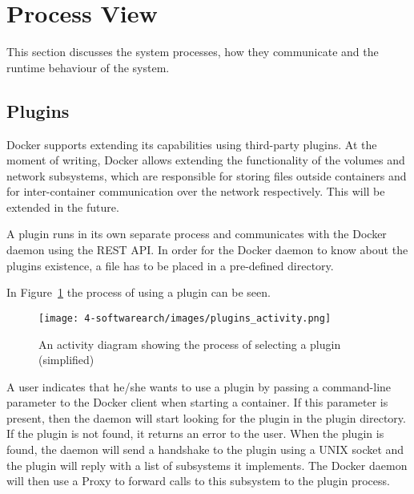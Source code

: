 
\section{Process View}
\label{sec:viewprocess}
This section discusses the system processes, how they communicate and the runtime behaviour of the system.

\subsection{Plugins}
\label{sec:processplugins}
Docker supports extending its capabilities using third-party plugins. At the moment of writing, Docker allows extending the functionality of the volumes and network subsystems, which are responsible for storing files outside containers and for inter-container communication over the network respectively. This will be extended in the future\cite{dockerplugindocs}.

A plugin runs in its own separate process and communicates with the Docker daemon using the REST API. In order for the Docker daemon to know about the plugins existence, a file has to be placed in a pre-defined directory. %

In Figure~\ref{fig:activity_plugin} the process of using a plugin can be seen.
\begin{figure}[H]
\caption{An activity diagram showing the process of selecting a plugin (simplified)}
\centering
\texttt{[image: 4-softwarearch/images/plugins\_activity.png]}
\label{fig:activity_plugin}
\end{figure}

A user indicates that he/she wants to use a plugin by passing a command-line parameter to the Docker client when starting a container. If this parameter is present, then the daemon will start looking for the plugin in the plugin directory. If the plugin is not found, it returns an error to the user. 
When the plugin is found, the daemon will send a handshake to the plugin using a UNIX socket and the plugin will reply with a list of subsystems it implements. 
The Docker daemon will then use a Proxy to forward calls to this subsystem to the plugin process.
